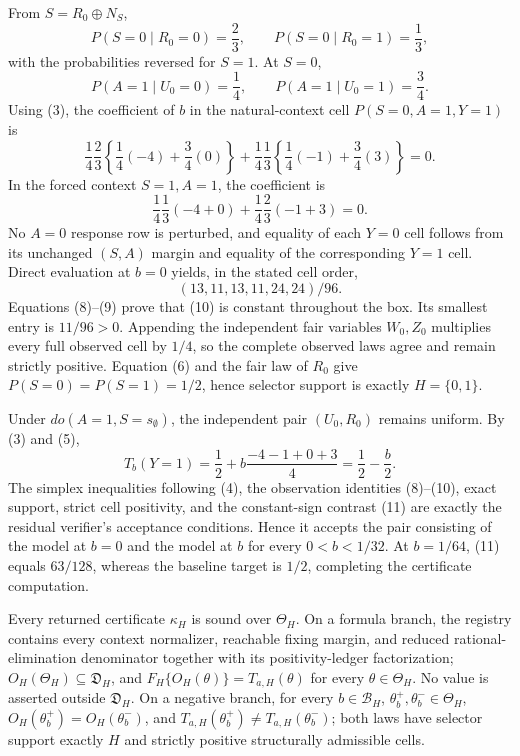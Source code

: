 From \(S=R_0\mathbin\oplus N_S\),
\[
 P(S=0\mid R_0=0)=\frac23,
 \qquad
 P(S=0\mid R_0=1)=\frac13,
\tag{6}
\]
with the probabilities reversed for \(S=1\).  At \(S=0\),
\[
 P(A=1\mid U_0=0)=\frac14,
 \qquad
 P(A=1\mid U_0=1)=\frac34.
\tag{7}
\]
Using (3), the coefficient of \(b\) in the natural-context cell \(P(S=0,A=1,Y=1)\) is
\[
 \frac14\frac23\left\{\frac14(-4)+\frac34(0)\right\}
 +\frac14\frac13\left\{\frac14(-1)+\frac34(3)\right\}=0.
\tag{8}
\]
In the forced context \(S=1,A=1\), the coefficient is
\[
 \frac14\frac13(-4+0)+\frac14\frac23(-1+3)=0.
\tag{9}
\]
No \(A=0\) response row is perturbed, and equality of each \(Y=0\) cell follows from its unchanged \((S,A)\) margin and equality of the corresponding \(Y=1\) cell.  Direct evaluation at \(b=0\) yields, in the stated cell order,
\[
 (13,11,13,11,24,24)/96.
\tag{10}
\]
Equations (8)--(9) prove that (10) is constant throughout the box.  Its smallest entry is \(11/96>0\).  Appending the independent fair variables \(W_0,Z_0\) multiplies every full observed cell by \(1/4\), so the complete observed laws agree and remain strictly positive.  Equation (6) and the fair law of \(R_0\) give \(P(S=0)=P(S=1)=1/2\), hence selector support is exactly \(H=\{0,1\}\).

Under \(do(A=1,S=s_{\emptyset})\), the independent pair \((U_0,R_0)\) remains uniform.  By (3) and (5),
\[
 T_b(Y=1)=\frac12+b\frac{-4-1+0+3}{4}
 =\frac12-\frac b2.
\tag{11}
\]
The simplex inequalities following (4), the observation identities (8)--(10), exact support, strict cell positivity, and the constant-sign contrast (11) are exactly the residual verifier's acceptance conditions.  Hence it accepts the pair consisting of the model at \(b=0\) and the model at \(b\) for every \(0<b<1/32\).  At \(b=1/64\), (11) equals \(63/128\), whereas the baseline target is \(1/2\), completing the certificate computation.

Every returned certificate \(\kappa_H\) is sound over \(\Theta_H\). On a formula branch, the registry contains every context normalizer, reachable fixing margin, and reduced rational-elimination denominator together with its positivity-ledger factorization; \(O_H(\Theta_H)\subseteq\mathfrak D_H\), and \(F_H\{O_H(\theta)\}=T_{a,H}(\theta)\) for every \(\theta\in\Theta_H\). No value is asserted outside \(\mathfrak D_H\). On a negative branch, for every \(b\in\mathcal B_H\), \(\theta_b^{+},\theta_b^{-}\in\Theta_H\), \(O_H(\theta_b^{+})=O_H(\theta_b^{-})\), and \(T_{a,H}(\theta_b^{+})\ne T_{a,H}(\theta_b^{-})\); both laws have selector support exactly \(H\) and strictly positive structurally admissible cells.


